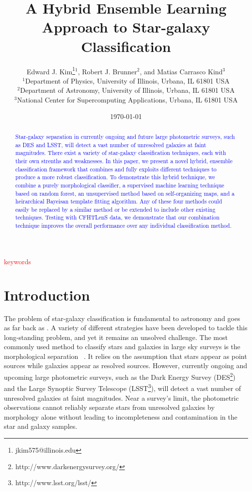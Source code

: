\documentclass[useAMS,usenatbib]{mn2e}
\title{A Hybrid Ensemble Learning Approach to Star-galaxy Classification}
\author[E. J. Kim et al.]{
  Edward J. Kim\thanks{jkim575@illinois.edu}$^1$, Robert J. Brunner$^2$,
  and Matias Carrasco Kind$^3$\\
$^1$Department of Physics, University of Illinois, Urbana, IL 61801 USA\\
$^2$Department of Astronomy, University of Illinois, Urbana, IL 61801 USA\\
$^3$National Center for Supercomputing Applications, Urbana, IL 61801 USA}
\begin{document}
\date{\today}

\pagerange{\pageref{firstpage}--\pageref{lastpage}} 

\maketitle

\label{firstpage}
\begin{abstract}
\textcolor{blue}{
Star-galaxy separation in currently ongoing and future
large photometric surveys, such as DES and LSST,
will detect a vast number of unresolved galaxies at faint magnitudes.
There exist a variety of star-galaxy classification techniques,
each with their own strenths and weaknesses.
In this paper, we present a novel hybrid, ensemble classification
framework that combines and fully exploits different techniques
to produce a more robust classification.
To demonstrate this hybrid technique,
we combine a purely morphological classifier,
a supervised machine learning technique based on random forest,
an unsupervised method based on self-organizing maps,
and a heirarchical Bayeisan template fitting algorithm.
Any of these four methods could
easily be replaced by a similar method
or be extended to include other existing techniques.
Testing with CFHTLenS data,
we demonstrate that our combination technique improves
the overall performance over any individual classification method.
}

\end{abstract}

\begin{keywords}
\textcolor{red}{keywords}
\end{keywords}


\section{Introduction}
  \label{section:introduction}

The problem of star-galaxy classification is fundamental to astronomy
and goes as far back as \cite{messier1781catalogue}.
A variety of different strategies have been developed 
to tackle this long-standing problem,
and yet it remains an unsolved challenge.
The most commonly used method to classify stars and galaxies
in large sky surveys is the morphological separation
~\citep{sebok1979optimal, kron1980photometry, valdes1982resolution,
yee1991faint, vasconcellos2011decision,
henrion2011bayesian}.
It relies on the assumption that
stars appear as point sources
while galaxies appear as resolved sources.
However,
currently ongoing and upcoming large photometric surveys,
such as the Dark Energy Survey
(DES\footnote{http://www.darkenergysurvey.org/})
and the Large Synoptic Survey Telescope
(LSST\footnote{http://www.lsst.org/lsst/}),
will detect a vast number of unresolved galaxies
at faint magnitudes.
Near a survey's limit, the photometric observations
cannot reliably separate stars from unresolved galaxies
by morphology alone without leading to
incompleteness and contamination in the star and galaxy samples.
\end{document}
